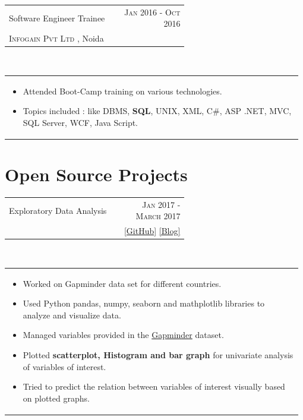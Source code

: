 \documentclass[a4paper]{article} %
\newcommand{\verticalspacing}{-0.25cm}
\newcommand{\bulletspace}{0.7cm}
\newcommand{\projectheadspacing}{6.9cm}
\newcommand{\cproject}[5]{%
    \begin{tabular}{p{0.60\linewidth}r}
        \textcolor{NavyBlue}{\small #2} & \multicolumn{1}{m{ \projectheadspacing{} }}{\raggedleft \small {\textsc{#1}}}\\
        \small {#3} & \small {#4}
    \end{tabular}\\
    \begin{tabular}{p{0.98\linewidth}}
    \vspace{-0.3cm}
        \small{#5}
    \end{tabular}
    \vspace{\verticalspacing{}}
}
\begin{document}
\cproject
      {Jan 2016 - Oct 2016}
      {Software Engineer Trainee}
      {\textsc{Infogain Pvt Ltd }, Noida}
      {}
      {%
        \begin{itemize}[leftmargin=\bulletspace{}]
          \item Attended Boot-Camp training on various technologies.
          \item Topics included : like DBMS, \textbf{SQL}, UNIX, XML, C\#, ASP .NET, MVC, SQL Server, WCF, Java Script.
        \end{itemize}
      }


\section{Open Source Projects}

\cproject
    {Jan 2017 - March 2017}
    {Exploratory Data Analysis}
    {\textsc{\raggedright Data Analysis, Coursera}}
    {\href{https://github.com/er-ashish01/Data_Management_and_Visualization} {[GitHub]} \href{https://erashish01.tumblr.com/post/156297127705/data-management-and-visualization-week4} {[Blog]}}
    {%
        \begin{itemize}[leftmargin=\bulletspace{}]
            \item Worked on Gapminder data set for different countries.
            \item Used Python pandas, numpy, seaborn and mathplotlib libraries to analyze and visualize data.
            \item Managed variables provided in the {\href{https://drive.google.com/file/d/1j3MM8wHSikaf8cCef9hhe9VKhs-VYW6b/view} {Gapminder}} dataset.
            \item Plotted \textbf{scatterplot, Histogram and bar graph} for univariate analysis of variables of interest.
            \item Tried to predict the relation between variables of interest visually based on plotted graphs.

        \end{itemize}
    }
\end{document}
